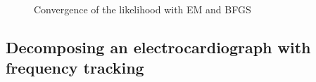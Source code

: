 \begin{figure}[htb]
\begin{subfigure}[b]{0.5\textwidth}
    \end{subfigure}%
    \caption{Convergence of the likelihood with EM and BFGS}\label{fig:ballistic_est}
 \end{figure}
 

\clearpage



\subsection{Decomposing an electrocardiograph with frequency tracking}
\parencite{Sarkka2012}

